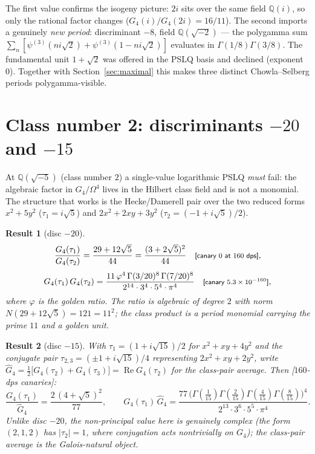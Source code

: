 \documentclass[11pt]{article}
\newtheorem{result}{Result}[section]
\theoremstyle{remark}
\newcommand{\dps}[1]{\textsf{\footnotesize[#1]}}
\begin{document}
The first value confirms the isogeny picture: $2i$ sits over the same field $\mathbb{Q}(i)$,
so only the rational factor changes ($G_4(i)/G_4(2i)=16/11$). The second imports a genuinely
\emph{new period}: discriminant $-8$, field $\mathbb{Q}(\sqrt{-2})$ --- the polygamma sum
$\sum_n[\psi^{(3)}(ni\sqrt2)+\psi^{(3)}(1-ni\sqrt2)]$ evaluates in $\Gamma(1/8)\Gamma(3/8)$.
The fundamental unit $1+\sqrt2$ was offered in the PSLQ basis and declined (exponent $0$).
Together with Section~\ref{sec:maximal} this makes three distinct Chowla--Selberg periods
polygamma-visible.

\section{Class number 2: discriminants \texorpdfstring{$-20$ and $-15$}{-20 and -15}}
\label{sec:h2}

At $\mathbb{Q}(\sqrt{-5})$ (class number $2$) a single-value logarithmic PSLQ \emph{must}
fail: the algebraic factor in $G_4/\Omega^4$ lives in the Hilbert class field and is not a
monomial. The structure that works is the Hecke/Damerell pair \cite{Damerell} over the two reduced forms
$x^2+5y^2$ ($\tau_1=i\sqrt5$) and $2x^2+2xy+3y^2$ ($\tau_2=(-1+i\sqrt5)/2$).

\begin{result}[disc $-20$]\label{res:d20}
\[
\frac{G_4(\tau_1)}{G_4(\tau_2)}=\frac{29+12\sqrt5}{44}=\frac{(3+2\sqrt5)^2}{44}
\quad\text{\dps{canary $0$ at $160$ dps}},
\]
\[
G_4(\tau_1)\,G_4(\tau_2)
=\frac{11\,\varphi^4\,\Gamma(3/20)^8\,\Gamma(7/20)^8}{2^{14}\cdot3^4\cdot5^4\cdot\pi^4}
\quad\text{\dps{canary $5.3\times10^{-160}$}},
\]
where $\varphi$ is the golden ratio. The ratio is algebraic of degree $2$ with norm
$N(29+12\sqrt5)=121=11^2$; the class product is a period monomial carrying the prime $11$
and a golden unit.
\end{result}

\begin{result}[disc $-15$]\label{res:d15}
With $\tau_1=(1+i\sqrt{15})/2$ for $x^2+xy+4y^2$ and the conjugate pair
$\tau_{2,3}=(\pm1+i\sqrt{15})/4$ representing $2x^2+xy+2y^2$, write
$\widehat G_4=\tfrac12\bigl[G_4(\tau_2)+G_4(\tau_3)\bigr]
=\operatorname{Re}G_4(\tau_2)$ for the class-pair average. Then
\dps{$160$-dps canaries}:
\[
\frac{G_4(\tau_1)}{\widehat G_4}=\frac{2\,(4+\sqrt5)^2}{77},\qquad
G_4(\tau_1)\,\widehat G_4
=\frac{77\,\bigl(\Gamma(\tfrac1{15})\Gamma(\tfrac2{15})\Gamma(\tfrac4{15})
\Gamma(\tfrac8{15})\bigr)^4}{2^{13}\cdot3^6\cdot5^5\cdot\pi^4}.
\]
Unlike disc $-20$, the non-principal value here is genuinely complex (the form
$(2,1,2)$ has $|\tau_2|=1$, where conjugation acts nontrivially on $G_4$); the
class-pair average is the Galois-natural object.
\end{result}
\end{document}
